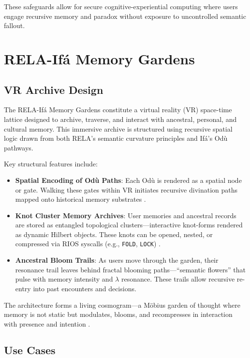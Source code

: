 \documentclass[12]{amsart}
\theoremstyle{plain}
\begin{document}
These safeguards allow for secure cognitive-experiential computing where users engage recursive memory and paradox without exposure to uncontrolled semantic fallout.

\section{RELA-Ifá Memory Gardens}

\subsection{VR Archive Design}

The RELA-Ifá Memory Gardens constitute a virtual reality (VR) space-time lattice designed to archive, traverse, and interact with ancestral, personal, and cultural memory. This immersive archive is structured using recursive spatial logic drawn from both RELA’s semantic curvature principles and Ifá’s Odù pathways.

Key structural features include:

\begin{itemize}
    \item \textbf{Spatial Encoding of Odù Paths}: Each Odù is rendered as a spatial node or gate. Walking these gates within VR initiates recursive divination paths mapped onto historical memory substrates \cite{abimbola1997ifaism}.
    
    \item \textbf{Knot Cluster Memory Archives}: User memories and ancestral records are stored as entangled topological clusters—interactive knot-forms rendered as dynamic Hilbert objects. These knots can be opened, nested, or compressed via RIOS syscalls (e.g., \texttt{FOLD}, \texttt{LOCK}) \cite{kauffman1991knots}.
    
    \item \textbf{Ancestral Bloom Trails}: As users move through the garden, their resonance trail leaves behind fractal blooming paths—“semantic flowers” that pulse with memory intensity and $\lambda$ resonance. These trails allow recursive re-entry into past encounters and decisions.
\end{itemize}

The architecture forms a living cosmogram—a Möbius garden of thought where memory is not static but modulates, blooms, and recompresses in interaction with presence and intention \cite{inger1995cosmogram}.

\subsection{Use Cases}
\end{document}
